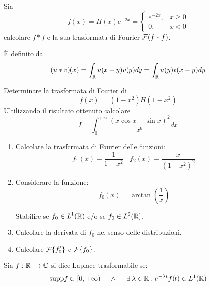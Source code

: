 Sia
\begin{equation*}
f( x) =H( x) e^{-2x} =\begin{cases}
e^{-2x} , & x\geqslant 0\\
0, & x< 0
\end{cases}
\end{equation*}
calcolare $\displaystyle f*f$ e la sua trasformata di Fourier $\displaystyle \mathcal{F} ( f*f)$.
\begin{rem}
 È definito da
\begin{equation*}
( u*v)( x) =\int _{\mathbb{R} } u( x-y) v( y) dy=\int _{\mathbb{R} } u( y) v( x-y) dy
\end{equation*}
\end{rem}
\Esercizio{}

Determinare la trasformata di Fourier di
\begin{equation*}
f( x) =\ \left( 1-x^{2}\right) H\left( 1-x^{2}\right)
\end{equation*}
Ultilizzando il risultato ottenuto calcolare
\begin{equation*}
I=\int ^{+\infty }_{0}\frac{( x\cos x-\sin x)^{2}}{x^{6}} dx
\end{equation*}
\Esercizio{}
\begin{enumerate}
\item Calcolare la trasformata di Fourier delle funzioni:\begin{equation*}
f_{1}( x) =\frac{1}{1+x^{2}} \ \ \ \ f_{2}( x) =\frac{x}{\left( 1+x^{2}\right)^{2}}
\end{equation*}
\item Considerare la funzione:\begin{equation*}
f_{0}( x) =\arctan\left(\frac{1}{x}\right)
\end{equation*}

Stabilire se $\displaystyle f_{0} \in L^{1}(\mathbb{R} )$ e/o se $\displaystyle f_{0} \in L^{2}(\mathbb{R} )$.
\item Calcolare la derivata di $\displaystyle f_{0}$ nel senso delle distribuzioni.
\item Calcolare $\mathcal{F} \{f'_{0}\}$ e $\mathcal{F} \{f_{0}\}$.
\end{enumerate}
\Esercizio{}
\begin{defn}
Sia $\displaystyle f:\mathbb{R}  \ \rightarrow \mathbb{C} $ si dice Laplace-trasformabile se:
\begin{equation*}
\mathrm{supp} f\subset [ 0,+\infty ) \ \ \ \ \land \ \ \ \ \exists \lambda \in \RR  :e^{-\lambda t} f( t) \in L^{1}(\RR )
\end{equation*}
\end{defn}

